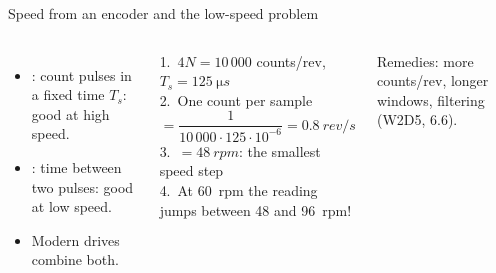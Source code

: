 \documentclass[aspectratio=169,10pt]{beamer}
\begin{document}
\begin{frame}{Speed from an encoder and the low-speed problem}
\begin{columns}[T]
\centering
{}

\vspace{2mm}
\begin{itemize}\small
\item {}: count pulses in a fixed time $T_s$: good at high speed.
\item {}: time between two pulses: good at low speed.
\item Modern drives combine both.
\end{itemize}
\begin{keybox}
\small
1.\ $4N=10\,000$ counts/rev, $T_s=\SI{125}{\micro s}$\\[1mm]
2.\ One count per sample $=\dfrac{1}{10\,000\cdot125\cdot10^{-6}}=\SI{0.8}{rev/s}$\\[1mm]
3.\ $=\SI{48}{rpm}$: the smallest speed step\\[1mm]
4.\ At \SI{60}{rpm} the reading jumps between 48 and \SI{96}{rpm}!
\end{keybox}
\begin{notebox}
\small Remedies: more counts/rev, longer windows, filtering (W2D5, 6.6).
\end{notebox}
\end{columns}
\end{frame}
\end{document}
